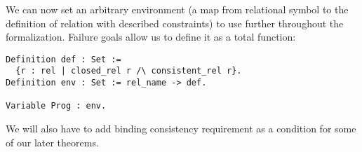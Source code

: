 { \color{blue} We can now set an arbitrary environment (a map from relational symbol to the definition of relation with described constraints) to use further throughout the formalization. } Failure goals allow us to define it as
a total function:

\begin{lstlisting}[language=Coq,basicstyle=\footnotesize]
Definition def : Set := 
  {r : rel | closed_rel r /\ consistent_rel r}.
Definition env : Set := rel_name -> def.

Variable Prog : env.
\end{lstlisting}

{ \color{blue} We will also have to add binding consistency requirement as a condition for some of our later theorems. }

